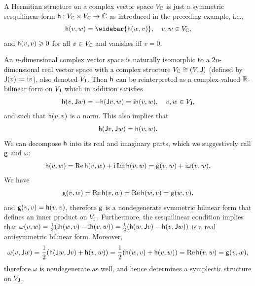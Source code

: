 \begin{example}\label{ex hermitian structures}
    A Hermitian structure on a complex vector space $V_{\mathbb{C}}$ is just a symmetric sesquilinear form $\mathsf{h}:V_{\mathbb{C}}\times V_{\mathbb{C}}\to \mathbb{C}$ as introduced in the preceding example, i.e.,
    \[\sfh(v,w)=\widebar{{\sfh}(w,v)},\quad v,w\in V_\bbC,\]
    and $\mathsf{h}(v,v)\geqslant 0$ for all $v\in V_{\mathbb{C}}$ and vanishes iff $v=0$.
    
    An $n$-dimensional complex vector space is naturally isomorphic to a $2n$-dimensional real vector space with a complex structure $V_{\mathbb{C}}\cong (V,\mathsf{J})$ (defined by $\mathsf{J}(v)\coloneqq \mathrm{i} v$), also denoted $V_{\mathsf{J}}$. Then $\mathsf{h}$ can be reinterpreted as a complex-valued $\mathbb{R}$-bilinear form on $V_{\mathsf{J}}$ which in addition satisfies
    \[\mathsf{h}(v,\mathsf{J} w)=-\mathsf{h}(\mathsf{J} v,w)=\mathrm{i}\mathsf{h}(v,w),\quad v,w\in V_{\mathsf{J}},\]
    and such that $\mathsf{h}(v,v)$ is a norm. This also implies that
    \[\mathsf{h}(\mathsf{J} v,\mathsf{J} w)=\mathsf{h}(v,w).\]
    We can decompose $\mathsf{h}$ into its real and imaginary parts, which we suggestively call $\mathsf{g}$ and $\omega$:
    \[\mathsf{h}(v,w)=\operatorname{Re} \mathsf{h}(v,w)+\mathrm{i}\operatorname{Im}\mathsf{h}(v,w)=\mathsf{g}(v,w)+\mathrm{i} \omega(v,w).\]
    We have
    \[\mathsf{g}(v,w)=\operatorname{Re} \mathsf{h}(v,w)=\operatorname{Re} \mathsf{h}(w,v)=\mathsf{g}(w,v),\]
    and $\mathsf{g}(v,v)=\mathsf{h}(v,v)$, therefore $\mathsf{g}$ is a nondegenerate symmetric bilinear form that defines an inner product on $V_{\mathsf{J}}$.
    Furthermore, the sesquilinear condition implies that 
    $\omega(v,w)=\frac12 (\mathrm{i}\mathsf{h}(w,v)-\mathrm{i}\mathsf{h}(v,w))=\frac12 (\mathsf{h}(w,\mathsf{J} v)-\mathsf{h}(v,\mathsf{J} w))$
    is a real antisymmetric bilinear form. 
    Moreover,
    \[\omega(v,\mathsf{J} w)=\frac12 (\mathsf{h}(\mathsf{J} w,\mathsf{J} v)+\mathsf{h}(v,w))=\frac12 (\mathsf{h}(w,v)+\mathsf{h}(v,w))=\operatorname{Re} \mathsf{h}(v,w)=\mathsf{g}(v,w),\]
    therefore $\omega$ is nondegenerate as well, and hence determines a symplectic structure on $V_{\mathsf{J}}$. 


\end{example}
